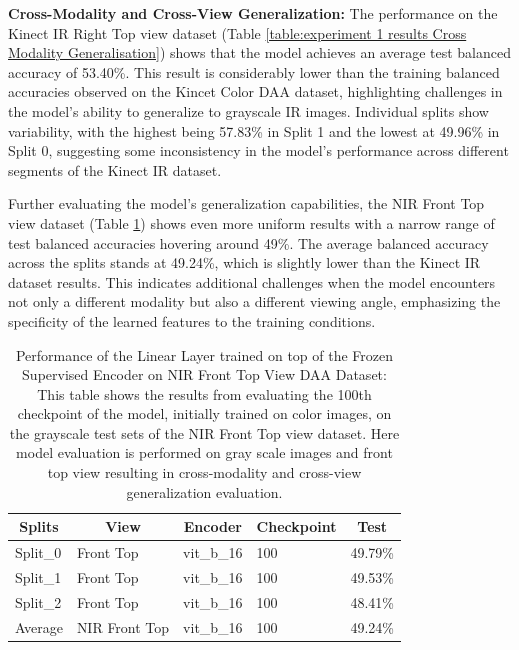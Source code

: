 \textbf{Cross-Modality and Cross-View Generalization:}
The performance on the Kinect IR Right Top view dataset (Table \ref{table:experiment 1 results Cross Modality Generalisation}) shows that the model achieves an average test balanced accuracy of 53.40\%. This result is considerably lower than the training balanced accuracies observed on the Kincet Color DAA dataset, highlighting challenges in the model's ability to generalize to grayscale IR images. Individual splits show variability, with the highest being 57.83\% in Split 1 and the lowest at 49.96\% in Split 0, suggesting some inconsistency in the model's performance across different segments of the Kinect IR dataset.

Further evaluating the model's generalization capabilities, the NIR Front Top view dataset (Table \ref{table:experiment 1 results Cross Modality and view Generalisation on NIR}) shows even more uniform results with a narrow range of test balanced accuracies hovering around 49\%. The average balanced accuracy across the splits stands at 49.24\%, which is slightly lower than the Kinect IR dataset results. This indicates additional challenges when the model encounters not only a different modality but also a different viewing angle, emphasizing the specificity of the learned features to the training conditions.
\begin{table}[htbp]
\caption[Results of Experiment 1 for Cross Modality and Cross view Generalisation.]{Performance of the Linear Layer trained on top of the Frozen Supervised Encoder on NIR Front Top View DAA Dataset: This table shows the results from evaluating the 100th checkpoint of the model, initially trained on color images, on the grayscale test sets of the NIR Front Top view dataset. Here model evaluation is performed on gray scale images and front top view resulting in cross-modality and cross-view generalization evaluation.}
\label{table:experiment 1 results Cross Modality and view Generalisation on NIR}
\centering
\begin{tabular}{lllll}
\multicolumn{1}{c}{\textbf{Splits}} & \multicolumn{1}{c}{\textbf{View}} & \multicolumn{1}{c}{\textbf{Encoder}} & \multicolumn{1}{c}{\textbf{Checkpoint}} & \multicolumn{1}{c}{\textbf{Test}}\\
\hline
Split\_0 & Front Top & vit\_b\_16 & 100 & 49.79\% \\
Split\_1 & Front Top & vit\_b\_16 & 100 & 49.53\% \\
Split\_2 & Front Top & vit\_b\_16 & 100 & 48.41\% \\
\hline
Average & NIR Front Top & vit\_b\_16 & 100 & 49.24\% \\
\hline
\end{tabular}
\end{table}

